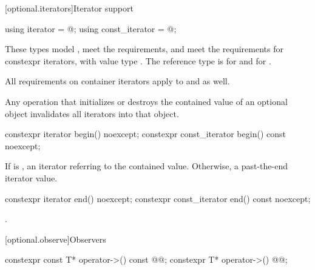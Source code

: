 [optional.iterators]{Iterator support}

%
%
\begin{itemdecl}
using iterator = @\impdef@;
using const_iterator = @\impdef@;
\end{itemdecl}

\begin{itemdescr}
\pnum
These types model , meet the  requirements, and meet the requirements for constexpr iterators, with value type . The reference type is  for  and  for .

\pnum
All requirements on container iterators apply to  and  as well.

\pnum
Any operation that initializes or destroys the contained value of an optional object invalidates all iterators into that object.
\end{itemdescr}

%
\begin{itemdecl}
constexpr iterator begin() noexcept;
constexpr const_iterator begin() const noexcept;
\end{itemdecl}

\begin{itemdescr}
\pnum
\returns
If  is , an iterator referring to the contained value. Otherwise, a past-the-end iterator value.
\end{itemdescr}

%
\begin{itemdecl}
constexpr iterator end() noexcept;
constexpr const_iterator end() const noexcept;
\end{itemdecl}

\begin{itemdescr}
\pnum
\returns
{}.
\end{itemdescr}

[optional.observe]{Observers}

%
\begin{itemdecl}
constexpr const T* operator->() const @@;
constexpr T* operator->() @@;
\end{itemdecl}

